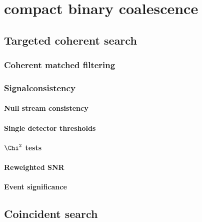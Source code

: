 \documentclass[binding=0.6cm, LaM]{sapthesis}
\begin{document}
\chapter{compact binary coalescence}

\section{Targeted coherent search}


\subsection{Coherent matched filtering}

\subsection{Signalconsistency}


\subsubsection{Null stream consistency}


\subsubsection{Single detector thresholds}



\subsubsection{$\Chi^2$ tests}

\subsubsection{Reweighted SNR}

\subsubsection{Event significance}


\section{Coincident search}

\end{document}
